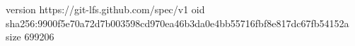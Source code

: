 version https://git-lfs.github.com/spec/v1
oid sha256:9900f5e70a72d7b003598cd970ea46b3da0e4bb55716fbf8e817dc67fb54152a
size 699206
